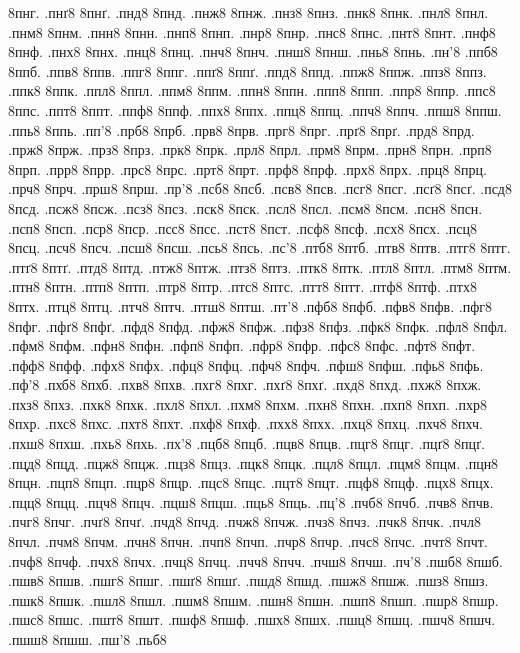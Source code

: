 {8пнг.
.пнґ8
8пнґ.
.пнд8
8пнд.
.пнж8
8пнж.
.пнз8
8пнз.
.пнк8
8пнк.
.пнл8
8пнл.
.пнм8
8пнм.
.пнн8
8пнн.
.пнп8
8пнп.
.пнр8
8пнр.
.пнс8
8пнс.
.пнт8
8пнт.
.пнф8
8пнф.
.пнх8
8пнх.
.пнц8
8пнц.
.пнч8
8пнч.
.пнш8
8пнш.
.пнь8
8пнь.
.пн'8
.ппб8
8ппб.
.ппв8
8ппв.
.ппг8
8ппг.
.ппґ8
8ппґ.
.ппд8
8ппд.
.ппж8
8ппж.
.ппз8
8ппз.
.ппк8
8ппк.
.ппл8
8ппл.
.ппм8
8ппм.
.ппн8
8ппн.
.ппп8
8ппп.
.ппр8
8ппр.
.ппс8
8ппс.
.ппт8
8ппт.
.ппф8
8ппф.
.ппх8
8ппх.
.ппц8
8ппц.
.ппч8
8ппч.
.ппш8
8ппш.
.ппь8
8ппь.
.пп'8
.прб8
8прб.
.прв8
8прв.
.прг8
8прг.
.прґ8
8прґ.
.прд8
8прд.
.прж8
8прж.
.прз8
8прз.
.прк8
8прк.
.прл8
8прл.
.прм8
8прм.
.прн8
8прн.
.прп8
8прп.
.прр8
8прр.
.прс8
8прс.
.прт8
8прт.
.прф8
8прф.
.прх8
8прх.
.прц8
8прц.
.прч8
8прч.
.прш8
8прш.
.пр'8
.псб8
8псб.
.псв8
8псв.
.псг8
8псг.
.псґ8
8псґ.
.псд8
8псд.
.псж8
8псж.
.псз8
8псз.
.пск8
8пск.
.псл8
8псл.
.псм8
8псм.
.псн8
8псн.
.псп8
8псп.
.пср8
8пср.
.псс8
8псс.
.пст8
8пст.
.псф8
8псф.
.псх8
8псх.
.псц8
8псц.
.псч8
8псч.
.псш8
8псш.
.псь8
8псь.
.пс'8
.птб8
8птб.
.птв8
8птв.
.птг8
8птг.
.птґ8
8птґ.
.птд8
8птд.
.птж8
8птж.
.птз8
8птз.
.птк8
8птк.
.птл8
8птл.
.птм8
8птм.
.птн8
8птн.
.птп8
8птп.
.птр8
8птр.
.птс8
8птс.
.птт8
8птт.
.птф8
8птф.
.птх8
8птх.
.птц8
8птц.
.птч8
8птч.
.птш8
8птш.
.пт'8
.пфб8
8пфб.
.пфв8
8пфв.
.пфг8
8пфг.
.пфґ8
8пфґ.
.пфд8
8пфд.
.пфж8
8пфж.
.пфз8
8пфз.
.пфк8
8пфк.
.пфл8
8пфл.
.пфм8
8пфм.
.пфн8
8пфн.
.пфп8
8пфп.
.пфр8
8пфр.
.пфс8
8пфс.
.пфт8
8пфт.
.пфф8
8пфф.
.пфх8
8пфх.
.пфц8
8пфц.
.пфч8
8пфч.
.пфш8
8пфш.
.пфь8
8пфь.
.пф'8
.пхб8
8пхб.
.пхв8
8пхв.
.пхг8
8пхг.
.пхґ8
8пхґ.
.пхд8
8пхд.
.пхж8
8пхж.
.пхз8
8пхз.
.пхк8
8пхк.
.пхл8
8пхл.
.пхм8
8пхм.
.пхн8
8пхн.
.пхп8
8пхп.
.пхр8
8пхр.
.пхс8
8пхс.
.пхт8
8пхт.
.пхф8
8пхф.
.пхх8
8пхх.
.пхц8
8пхц.
.пхч8
8пхч.
.пхш8
8пхш.
.пхь8
8пхь.
.пх'8
.пцб8
8пцб.
.пцв8
8пцв.
.пцг8
8пцг.
.пцґ8
8пцґ.
.пцд8
8пцд.
.пцж8
8пцж.
.пцз8
8пцз.
.пцк8
8пцк.
.пцл8
8пцл.
.пцм8
8пцм.
.пцн8
8пцн.
.пцп8
8пцп.
.пцр8
8пцр.
.пцс8
8пцс.
.пцт8
8пцт.
.пцф8
8пцф.
.пцх8
8пцх.
.пцц8
8пцц.
.пцч8
8пцч.
.пцш8
8пцш.
.пць8
8пць.
.пц'8
.пчб8
8пчб.
.пчв8
8пчв.
.пчг8
8пчг.
.пчґ8
8пчґ.
.пчд8
8пчд.
.пчж8
8пчж.
.пчз8
8пчз.
.пчк8
8пчк.
.пчл8
8пчл.
.пчм8
8пчм.
.пчн8
8пчн.
.пчп8
8пчп.
.пчр8
8пчр.
.пчс8
8пчс.
.пчт8
8пчт.
.пчф8
8пчф.
.пчх8
8пчх.
.пчц8
8пчц.
.пчч8
8пчч.
.пчш8
8пчш.
.пч'8
.пшб8
8пшб.
.пшв8
8пшв.
.пшг8
8пшг.
.пшґ8
8пшґ.
.пшд8
8пшд.
.пшж8
8пшж.
.пшз8
8пшз.
.пшк8
8пшк.
.пшл8
8пшл.
.пшм8
8пшм.
.пшн8
8пшн.
.пшп8
8пшп.
.пшр8
8пшр.
.пшс8
8пшс.
.пшт8
8пшт.
.пшф8
8пшф.
.пшх8
8пшх.
.пшц8
8пшц.
.пшч8
8пшч.
.пшш8
8пшш.
.пш'8
.пьб8
}
